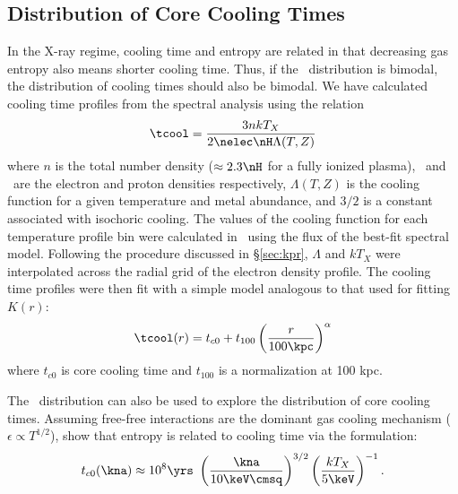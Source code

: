 \documentclass{emulateapj}
\begin{document}
\subsection{Distribution of Core Cooling Times}
\label{sec:hifl}

In the X-ray regime, cooling time and entropy are related in that
decreasing gas entropy also means shorter cooling time. Thus, if the
\kna\ distribution is bimodal, the distribution of cooling times
should also be bimodal. We have calculated cooling time profiles from
the spectral analysis using the relation
\begin{equation}
\tcool = \frac{3nkT_X}{2\nelec \nH \Lambda(T,Z)}
\label{eqn:tcool}
\end{equation}
where $n$ is the total number density ($\approx 2.3\nH$ for a fully
ionized plasma), \nelec\ and \nH\ are the electron and proton
densities respectively, $\Lambda(T,Z)$ is the cooling function for a
given temperature and metal abundance, and $3/2$ is a constant
associated with isochoric cooling. The values of the cooling function
for each temperature profile bin were calculated in \xspec\ using the
flux of the best-fit spectral model. Following the procedure discussed
in \S\ref{sec:kpr}, $\Lambda$ and $kT_X$ were interpolated across the
radial grid of the electron density profile. The cooling time profiles
were then fit with a simple model analogous to that used for fitting
$K(r)$:
\begin{equation}
\tcool(r) = t_{c0} + t_{100} \left(\frac{r}{100 \kpc}\right)^{\alpha}
\label{eqn:tc0}
\end{equation}
where $t_{c0}$ is core cooling time and $t_{100}$ is a normalization
at 100 kpc.

The \kna\ distribution can also be used to explore the distribution of
core cooling times. Assuming free-free interactions are the dominant
gas cooling mechanism (\ie\ $\epsilon \propto T^{1/2}$),
\citet{radioquiet} show that entropy is related to cooling time via
the formulation:
\begin{equation}
t_{c0}(\kna) \approx 10^8 \yrs\ \left(\frac{\kna}{10 \keV \cmsq}\right)^{3/2} \left(\frac{kT_X}{5 \keV}\right)^{-1}.
\label{eqn:tck0}
\end{equation}
\end{document}
